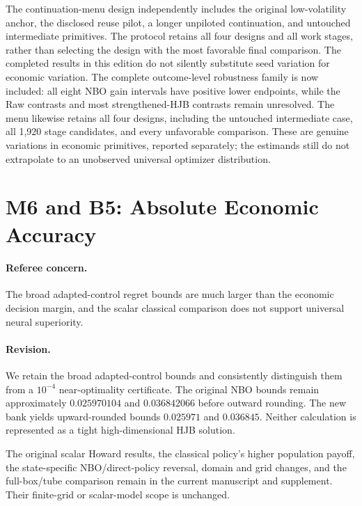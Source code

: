 The continuation-menu design independently includes the original low-volatility anchor, the disclosed reuse pilot, a longer unpiloted continuation, and untouched intermediate primitives. The protocol retains all four designs and all work stages, rather than selecting the design with the most favorable final comparison. The completed results in this edition do not silently substitute seed variation for economic variation. The complete outcome-level robustness family is now included: all eight NBO gain intervals have positive lower endpoints, while the Raw contrasts and most strengthened-HJB contrasts remain unresolved. The menu likewise retains all four designs, including the untouched intermediate case, all 1,920 stage candidates, and every unfavorable comparison. These are genuine variations in economic primitives, reported separately; the estimands still do not extrapolate to an unobserved universal optimizer distribution.

\section{M6 and B5: Absolute Economic Accuracy}
\paragraph*{Referee concern.} The broad adapted-control regret bounds are much larger than the economic decision margin, and the scalar classical comparison does not support universal neural superiority.

\paragraph*{Revision.} We retain the broad adapted-control bounds and consistently distinguish them from a $10^{-4}$ near-optimality certificate. The original NBO bounds remain approximately $0.025970104$ and $0.036842066$ before outward rounding. The new bank yields upward-rounded bounds $0.025971$ and $0.036845$. Neither calculation is represented as a tight high-dimensional HJB solution.

The original scalar Howard results, the classical policy's higher population payoff, the state-specific NBO/direct-policy reversal, domain and grid changes, and the full-box/tube comparison remain in the current manuscript and supplement. Their finite-grid or scalar-model scope is unchanged.

